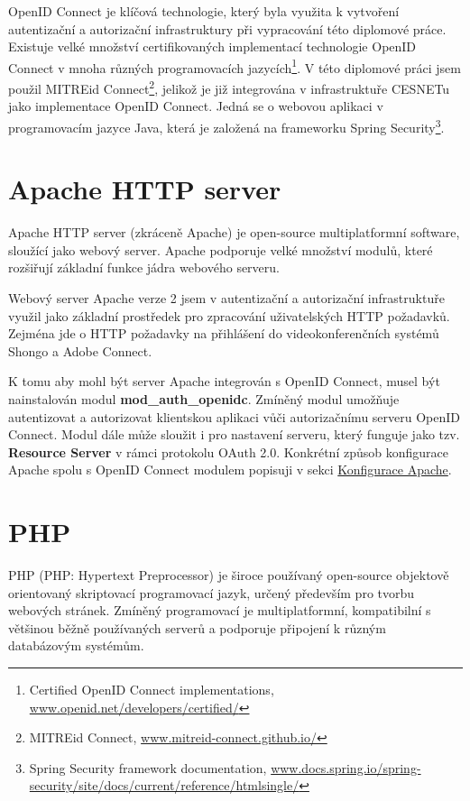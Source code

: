 \documentclass[
  printed, %
  twoside, %
  table,   %
  nolof,     %
  nolot,     %
]{fithesis3}
\begin{document}
\par
OpenID Connect je klíčová technologie, který byla využita k vytvoření autentizační a autorizační infrastruktury při vypracování této diplomové práce. Existuje velké množství certifikovaných implementací technologie OpenID Connect v mnoha různých programovacích jazycích\footnote{Certified OpenID Connect implementations, \url{www.openid.net/developers/certified/}}. V této diplomové práci jsem použil MITREid Connect\footnote{MITREid Connect, \url{www.mitreid-connect.github.io/}}, jelikož je již integrována v infrastruktuře CESNETu jako implementace OpenID Connect. Jedná se o webovou aplikaci v programovacím jazyce Java, která je založená na frameworku Spring Security\footnote{Spring Security framework documentation, \url{www.docs.spring.io/spring-security/site/docs/current/reference/htmlsingle/}}. 

\section{Apache HTTP server}
Apache HTTP server \cite{apache} (zkráceně Apache) je open-source multiplatformní software, sloužící jako webový server. Apache podporuje velké množství modulů, které rozšiřují základní funkce jádra webového serveru.  \par

Webový server Apache verze 2 jsem v autentizační a autorizační infrastruktuře využil jako základní prostředek pro zpracování uživatelských HTTP požadavků. Zejména jde o HTTP požadavky na přihlášení do videokonferenčních systémů Shongo a Adobe Connect. 
\par
K tomu aby mohl být server Apache integrován s OpenID Connect, musel být nainstalován modul \textbf{mod\_auth\_openidc}. Zmíněný modul umožňuje autentizovat a autorizovat klientskou aplikaci vůči autorizačnímu serveru OpenID Connect. Modul dále může sloužit i pro nastavení serveru, který funguje jako tzv. \textbf{Resource Server} v rámci protokolu OAuth 2.0. Konkrétní způsob konfigurace Apache spolu s OpenID Connect modulem popisuji v sekci \hyperref[apacheConfig]{Konfigurace Apache}.

\section{PHP}
PHP \cite{php5} (PHP: Hypertext Preprocessor) je široce používaný open-source objektově orientovaný skriptovací programovací jazyk, určený především pro tvorbu webových stránek. Zmíněný programovací je multiplatformní, kompatibilní s většinou běžně používaných serverů a podporuje připojení k různým databázovým systémům. 
\par
\end{document}
